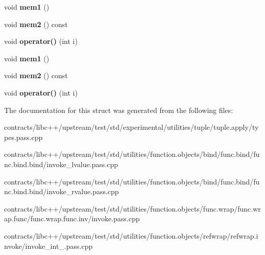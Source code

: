 \begin{DoxyCompactItemize}
void {\bfseries mem1} ()
\item 
\mbox{\label{struct_a__void__1_a099522f1aaceea875482c597d6d91d13}} 
void {\bfseries mem2} () const
\item 
\mbox{\label{struct_a__void__1_a7783b37629f8c78739554fa11ce30a75}} 
void {\bfseries operator()} (int i)
\item 
\mbox{\label{struct_a__void__1_aa4257ae8b31d75f4e32dff58599560f1}} 
void {\bfseries mem1} ()
\item 
\mbox{\label{struct_a__void__1_a099522f1aaceea875482c597d6d91d13}} 
void {\bfseries mem2} () const
\item 
\mbox{\label{struct_a__void__1_a7783b37629f8c78739554fa11ce30a75}} 
void {\bfseries operator()} (int i)
\end{DoxyCompactItemize}


The documentation for this struct was generated from the following files\+:\begin{DoxyCompactItemize}
\item 
contracts/libc++/upstream/test/std/experimental/utilities/tuple/tuple.\+apply/types.\+pass.\+cpp\item 
contracts/libc++/upstream/test/std/utilities/function.\+objects/bind/func.\+bind/func.\+bind.\+bind/invoke\+\_\+lvalue.\+pass.\+cpp\item 
contracts/libc++/upstream/test/std/utilities/function.\+objects/bind/func.\+bind/func.\+bind.\+bind/invoke\+\_\+rvalue.\+pass.\+cpp\item 
contracts/libc++/upstream/test/std/utilities/function.\+objects/func.\+wrap/func.\+wrap.\+func/func.\+wrap.\+func.\+inv/invoke.\+pass.\+cpp\item 
contracts/libc++/upstream/test/std/utilities/function.\+objects/refwrap/refwrap.\+invoke/invoke\+\_\+int\+\_.\+pass.\+cpp\end{DoxyCompactItemize}
